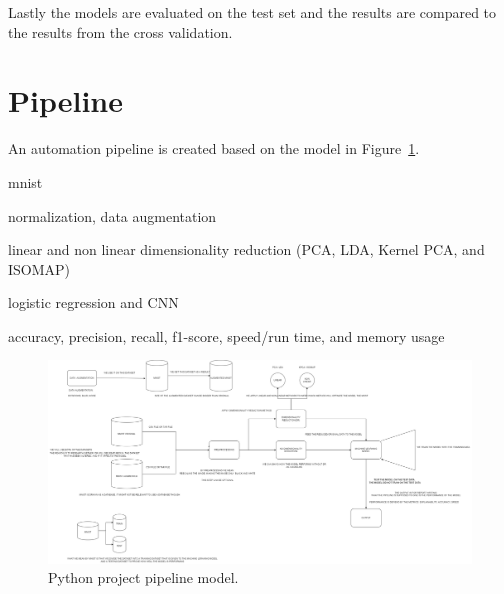 Lastly the models are evaluated on the test set and the results are compared to the results from the cross validation.

\section{Pipeline}\label{sec:pipeline}

An automation pipeline is created based on the model in Figure~\ref{fig:python-pipeline-model}.


\begin{description}
    \setlength\itemsep{0em}
    \item[dataset] mnist
    \item[pre-preprocessing] normalization, data augmentation
    \item[preprocessing] linear and non linear dimensionality reduction (PCA, LDA, Kernel PCA, and ISOMAP)
    \item[models] logistic regression and CNN
    \item[evaluation] accuracy, precision, recall, f1-score, speed/run time, and memory usage
\end{description}


\begin{figure}[htb!]
    \centering
    \includegraphics[width=\textwidth]{figures/pipeline-draft.png}
    \caption{Python project pipeline model.}
    \label{fig:python-pipeline-model}
\end{figure}


